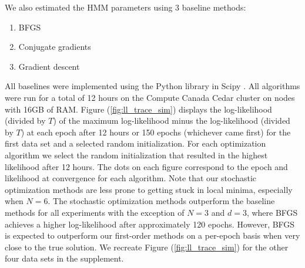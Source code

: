 We also estimated the HMM parameters using 3 baseline methods:
%
\begin{enumerate}
    \item BFGS \citep{Fletcher:2000}
    \item Conjugate gradients \citep{Fletcher:1964}
    \item Gradient descent
\end{enumerate}
%
All baselines were implemented using the Python library in Scipy \citep{Virtanen:2019}.
%
All algorithms were run for a total of 12 hours on the Compute Canada Cedar cluster on nodes with 16GB of RAM.
%
Figure (\ref{fig:ll_trace_sim}) displays the log-likelihood (divided by $T$) of the maximum log-likelihood minus the log-likelihood (divided by $T$) at each epoch after 12 hours or 150 epochs (whichever came first) for the first data set and a selected random initialization. For each optimization algorithm we select the random initialization that resulted in the highest likelihood after 12 hours. The dots on each figure correspond to the epoch and likelihood at convergence for each algorithm. Note that our stochastic optimization methods are less prone to getting stuck in local minima, especially when $N=6$. The stochastic optimization methods outperform the baseline methods for all experiments with the exception of $N = 3$ and $d = 3$, where BFGS achieves a higher log-likelihood after approximately 120 epochs. However, BFGS is expected to outperform our first-order methods on a per-epoch basis when very close to the true solution. We recreate Figure (\ref{fig:ll_trace_sim}) for the other four data sets in the supplement.
%
